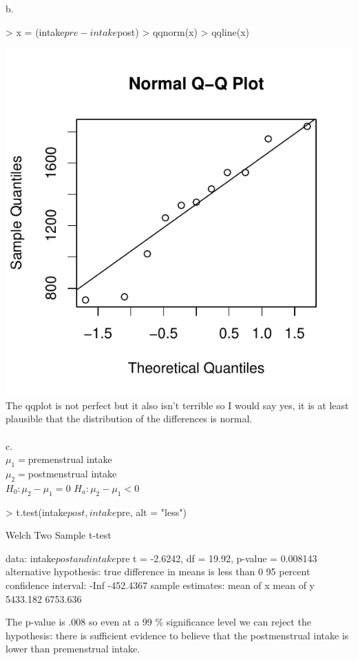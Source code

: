\documentclass[11pt,letterpaper]{article}
\begin{document}
\begin{enumerate}
b.\\
\begin{Schunk}
\begin{Sinput}
> x = (intake$pre - intake$post)
> qqnorm(x)
> qqline(x)
\end{Sinput}
\end{Schunk}
\includegraphics{midterm2-002}
\\
The qqplot is not perfect but it also isn't terrible so I would say yes, it is at least plausible that the distribution of the differences is normal.\\
\\

c.\\
$\mu_1=$premenstrual intake\\
$\mu_2=$postmenstrual intake\\
$H_0:\mu_2-\mu_1=0$
$H_a:\mu_2-\mu_1<0$
\begin{Schunk}
\begin{Sinput}
> t.test(intake$post, intake$pre, alt = "less")
\end{Sinput}
\begin{Soutput}
	Welch Two Sample t-test

data:  intake$post and intake$pre 
t = -2.6242, df = 19.92, p-value = 0.008143
alternative hypothesis: true difference in means is less than 0 
95 percent confidence interval:
      -Inf -452.4367 
sample estimates:
mean of x mean of y 
 5433.182  6753.636 
\end{Soutput}
\end{Schunk}
The p-value is .008 so even at a 99 \% significance level we can reject the hypothesis: there is sufficient evidence to believe that the postmenstrual intake is lower than premenstrual intake.\\


\end{enumerate}
\end{document}
